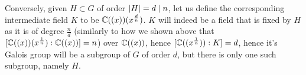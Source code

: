 \documentclass[8pt]{article} %
\begin{document}
\begin{enumerate}[label=\bfseries Problem \arabic*.]
{\begin{enumerate}[label=(\arabic*).]
{				Conversely, given $H\subset G$ of order $\left|H\right|=d\mid n$, let us define the corresponding intermediate field $K$ to be
				$\mathbb{C}((x))(x^{\frac{d}{n}})$. $K$ will indeed be a field that is fixed by $H$ as it is of degree $\frac{n}{d}$ (similarly to how we shown
				above that $[\mathbb{C}((x))(x^{\frac{1}{n}}):\mathbb{C}((x))]=n$) over $\mathbb{C}((x))$, hence $[\mathbb{C}((x^{\frac{1}{n}})):K]=d$, hence it's Galois group will be a subgroup of $G$ of order
				$d$, but there is only one such subgroup, namely $H$.
				}
		\end{enumerate}
		}
\end{enumerate}
\end{document}
